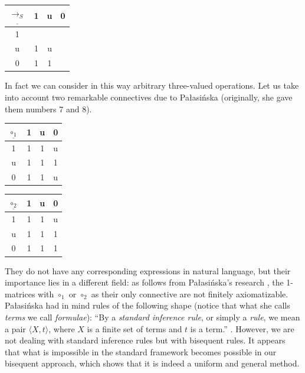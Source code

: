 \documentclass[11pt,a4paper,titlepage]{article}
\theoremstyle{definition}
\newcommand{\3}{\vspace{.3in}}
\newcommand{\2}{\vspace{.2in}}
\newcommand{\1}{\vspace{.1in}}
\newcommand{\5}{\vspace{.05in}}
\begin{document}
\1

\begin{tabular}{|c|ccc|}
	\hline
	$\underline{\rightarrow_S} $ & 1 & u & 0 \\
	\hline
	1 &  &  &  \\
	u & 1 & u &  \\
	0 & 1 & 1 &  \\
	\hline
\end{tabular}

\1

In fact we can consider in this way arbitrary three-valued operations. Let us take into account two remarkable connectives due to Pa\l{}asi\'{n}ska \cite{Palasinska} (originally, she gave them numbers 7 and 8). 

\begin{center}
	\begin{tabular}{|c|ccc|}
		\hline
		$\underline{\circ_1} $ & 1 & u & 0 \\
		\hline
		1 & 1 & 1 & u \\
		u & 1 & 1 & 1 \\
		0 & 1 & 1 & u \\
		\hline
	\end{tabular}
	\begin{tabular}{|c|ccc|}
		\hline
		$\underline{\circ_2} $ & 1 & u & 0 \\
		\hline
		1 & 1 & 1 & u \\
		u & 1 & 1 & 1 \\
		0 & 1 & 1 & 1 \\
		\hline
	\end{tabular}
\end{center}



They do not have any corresponding expressions in natural language, but their importance lies in a different field: as follows from Pa\l{}asi\'{n}ska's research \cite{Palasinska}, the 1-matrices with $ \circ_1 $ or $\circ_2$ as their only connective are not finitely axiomatizable. Pa\l{}asi\'{n}ska had in mind rules of the following shape (notice that what she calls \textit{terms} we call \textit{formulae}): 
``By a \textit{standard inference rule}, or simply a \textit{rule}, we mean a pair $ \langle X,t\rangle$, where $ X $ is a finite set of terms and $ t $ is a term.'' \cite[p. 362]{Palasinska}. However, we are not dealing with standard inference rules but with bisequent rules. It appears that  what is impossible in the standard framework becomes possible in our bisequent approach, which shows that it is indeed a uniform and general method.
\end{document}
